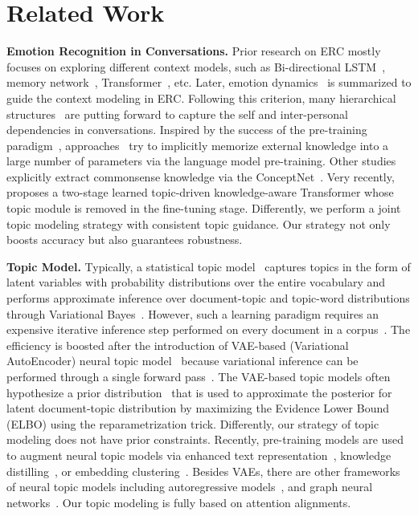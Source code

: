 \documentclass{ecai}
\begin{document}
\section{Related Work}

\textbf{Emotion Recognition in Conversations.} Prior research on ERC mostly focuses on exploring different context models, such as Bi-directional LSTM~\cite{poria2017context}, memory network~\cite{hazarika2018icon}, Transformer~\cite{mao2021dialoguetrm}, etc. Later, emotion dynamics~\cite{kuppens2017emotion} is summarized to guide the context modeling in ERC. Following this criterion, many hierarchical structures~\cite{majumder2019dialoguernn,ghosal-etal-2019-dialoguegcn,mao2021dialoguetrm} are putting forward to capture the self and inter-personal dependencies in conversations. Inspired by the success of the pre-training paradigm~\cite{devlin2019bert}, approaches~\cite{hazarika2019emotion,shen2021dialogxl} try to implicitly memorize external knowledge into a large number of parameters via the language model pre-training. Other studies~\cite{zhong2019knowledge,ghosal2020cosmic} explicitly extract commonsense knowledge via the ConceptNet~\cite{speer20175}. Very recently, ~\cite{zhu2021topic} proposes a two-stage learned topic-driven knowledge-aware Transformer whose topic module is removed in the fine-tuning stage. Differently, we perform a joint topic modeling strategy with consistent topic guidance. Our strategy not only boosts accuracy but also guarantees robustness.

\noindent\textbf{Topic Model.} Typically, a statistical topic model~\cite{hofmann1999probabilistic,blei2003latent} captures topics in the form of latent variables with probability distributions over the entire vocabulary and performs approximate inference over document-topic and topic-word distributions through Variational Bayes~\cite{blei2008supervised}. However, such a learning paradigm requires an expensive iterative inference step performed on every document in a corpus~\cite{panwar2020tan}. The efficiency is boosted after the introduction of VAE-based (Variational AutoEncoder) neural topic model~\cite{bianchi2020pre,zhao2021neural} because variational inference can be performed through a single forward pass~\cite{kingma2013auto}. The VAE-based topic models often hypothesize a prior distribution~\cite{srivastava2017autoencoding,ding2018coherence} that is used to approximate the posterior for latent document-topic distribution by maximizing the Evidence Lower Bound (ELBO) using the reparametrization trick. Differently, our strategy of topic modeling does not have prior constraints. Recently, pre-training models are used to augment neural topic models via enhanced text representation~\cite{bianchi2020pre}, knowledge distilling~\cite{hoyle2020improving}, or embedding clustering~\cite{thompson2020topic}. Besides VAEs, there are other frameworks of neural topic models including autoregressive models~\cite{gupta2019document}, and graph neural networks~\cite{yang2020graph}. Our topic modeling is fully based on attention alignments.
\end{document}
